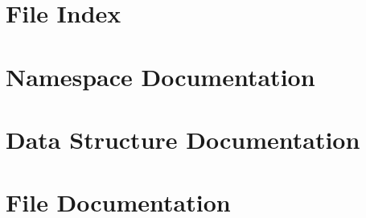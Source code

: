 \let\mypdfximage\pdfximage\def\pdfximage{\immediate\mypdfximage}\documentclass[twoside]{book}
\newcommand{\+}{\discretionary{\mbox{\scriptsize$\hookleftarrow$}}{}{}}
\newcommand{\clearemptydoublepage}{%
  \newpage{\pagestyle{empty}\cleardoublepage}%
}
\begin{document}
\chapter{File Index}

\chapter{Namespace Documentation}



\chapter{Data Structure Documentation}








\chapter{File Documentation}

























































\backmatter
\newpage
{}
\clearemptydoublepage
{}
\printindex
\end{document}
